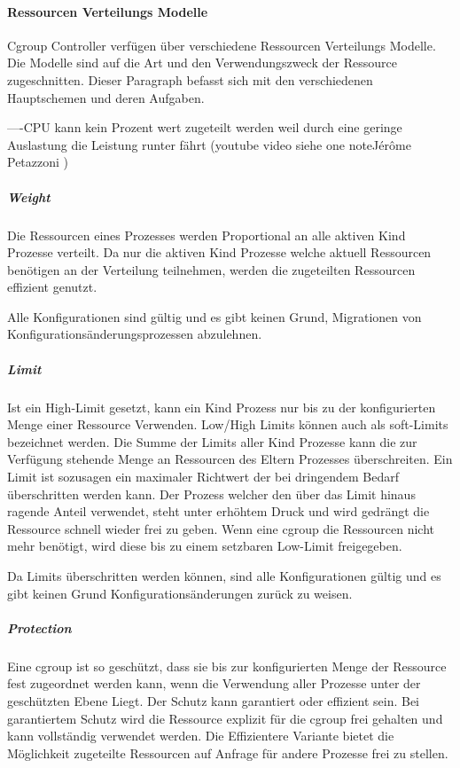 \paragraph{Ressourcen Verteilungs Modelle}
Cgroup Controller verfügen über verschiedene Ressourcen Verteilungs Modelle. Die Modelle sind auf die Art und den Verwendungszweck der Ressource zugeschnitten. Dieser Paragraph befasst sich mit den verschiedenen Hauptschemen und deren Aufgaben.

----CPU kann kein Prozent wert zugeteilt werden weil durch eine geringe Auslastung die Leistung runter fährt (youtube video siehe one noteJérôme Petazzoni )

\subparagraph{Weight}
Die Ressourcen eines Prozesses werden Proportional an alle aktiven Kind Prozesse verteilt. Da nur die aktiven Kind Prozesse welche aktuell Ressourcen benötigen an der Verteilung teilnehmen, werden die zugeteilten Ressourcen effizient genutzt. 

Alle Konfigurationen sind gültig und es gibt keinen Grund, Migrationen von Konfigurationsänderungsprozessen abzulehnen.

\subparagraph{Limit}
Ist ein High-Limit gesetzt, kann ein Kind Prozess nur bis zu der konfigurierten Menge einer Ressource Verwenden. Low/High Limits können auch als soft-Limits bezeichnet werden. Die Summe der Limits aller Kind Prozesse kann die zur Verfügung stehende Menge an Ressourcen des Eltern Prozesses überschreiten. Ein Limit ist sozusagen ein maximaler Richtwert der bei dringendem Bedarf überschritten werden kann. Der Prozess welcher den über das Limit hinaus ragende Anteil verwendet, steht unter erhöhtem Druck und wird gedrängt die Ressource schnell wieder frei zu geben. Wenn eine cgroup die Ressourcen nicht mehr benötigt, wird diese bis zu einem setzbaren Low-Limit freigegeben.

Da Limits überschritten werden können, sind alle Konfigurationen gültig und es gibt keinen Grund Konfigurationsänderungen zurück zu weisen.

\subparagraph{Protection}
Eine cgroup ist so geschützt, dass sie bis zur konfigurierten Menge der Ressource fest zugeordnet werden kann, wenn die Verwendung aller Prozesse unter der geschützten Ebene Liegt. Der Schutz kann garantiert oder effizient sein. Bei garantiertem Schutz wird die Ressource explizit für die cgroup frei gehalten und kann vollständig verwendet werden. Die Effizientere Variante bietet die Möglichkeit zugeteilte Ressourcen auf Anfrage für andere Prozesse frei zu stellen.


